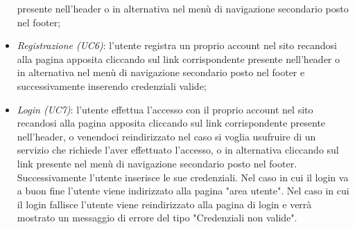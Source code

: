 \begin{itemize}
	presente nell'header o in alternativa
	nel menù di navigazione secondario posto nel footer;
	\item \textit{Registrazione (UC6)}: l'utente registra un proprio account nel sito recandosi alla
	pagina apposita cliccando sul link corrispondente presente nell'header o in alternativa nel menù di
	navigazione secondario posto nel footer e successivamente inserendo credenziali valide;
	\item \textit{Login (UC7)}: l'utente effettua l'accesso con il proprio account nel sito recandosi
	alla pagina apposita cliccando sul link corrispondente presente nell'header, o venendoci
	reindirizzato nel caso si voglia usufruire di un servizio che richiede l'aver effettuato l'accesso, o
	in alternativa cliccando sul link presente nel menù di
	navigazione secondario posto nel footer. Successivamente l'utente inserisce le sue credenziali. Nel
	caso in cui il login va a buon fine l'utente viene indirizzato alla pagina "area utente". Nel
	caso in cui il login fallisce l'utente viene reindirizzato alla pagina di login e verrà mostrato un
	messaggio di errore del tipo "Credenziali non valide".
\end{itemize}
